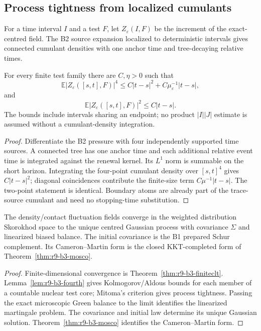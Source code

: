 \subsection{Process tightness from localized cumulants}

For a time interval $I$ and a test $F$, let $Z_\varepsilon(I,F)$ be the
increment of the exact-centred field.  The B2 source expansion localized to
deterministic intervals gives connected cumulant densities with one anchor
time and tree-decaying relative times.

\begin{lemma}
\label{lem:r9-b3-fourth}
For every finite test family there are $C,\eta>0$ such that
\[
 \mathbb E|Z_\varepsilon([s,t],F)|^4
 \le C|t-s|^{2}+C\mu_\varepsilon^{-1}|t-s|,
\]
and
\[
 \mathbb E|Z_\varepsilon([s,t],F)|^2
 \le C|t-s|.
\]
The bounds include intervals sharing an endpoint; no product
$|I||J|$ estimate is assumed without a cumulant-density integration.
\end{lemma}

\begin{proof}
Differentiate the B2 pressure with four independently supported time sources.
A connected tree has one anchor time and each additional relative event time
is integrated against the renewal kernel.  Its $L^1$ norm is summable on the
short horizon.  Integrating the four-point cumulant density over
$[s,t]^4$ gives $C|t-s|^2$; diagonal coincidences contribute the finite-size
term $C\mu^{-1}|t-s|$.  The two-point statement is identical.  Boundary atoms
are already part of the trace-source cumulant and need no stopping-time
substitution.
\end{proof}

\begin{theorem}
\label{thm:r9-b3-main}
The density/contact fluctuation fields converge in the weighted distribution
Skorokhod space to the unique centred Gaussian process with covariance
$\Sigma$ and linearized biased balance.  The initial covariance is the B1
prepared Schur complement.  Its Cameron--Martin form is the closed
KKT-completed form of Theorem~\ref{thm:r9-b3-mosco}.
\end{theorem}

\begin{proof}
Finite-dimensional convergence is
Theorem~\ref{thm:r9-b3-finiteclt}.  Lemma~\ref{lem:r9-b3-fourth} gives
Kolmogorov/Aldous bounds for each member of a countable nuclear test core;
Mitoma's criterion gives process tightness.  Passing the exact microscopic
Green balance to the limit identifies the linearized martingale problem.
The covariance and initial law determine its unique Gaussian solution.
Theorem~\ref{thm:r9-b3-mosco} identifies the Cameron--Martin form.
\end{proof}

